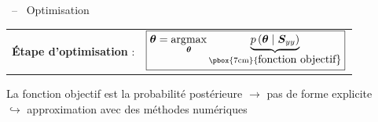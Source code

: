 \documentclass[10pt,xcolor=x11names,compress, show notes]{beamer}%
\newlength{\pas}	\setlength{\pas}{0.2cm}
\begin{document}
\begin{frame}{\insertsectionhead ~--~ Optimisation}
	\centering
	\vfill	
	\begin{tabular}{c c}
		\textbf{Étape d'optimisation }:&
		$\boxed{ \displaystyle  \bm{\theta} =\underset{\bm{\theta}}{\arg\!\max} \underbrace{p\left( \bm{\theta} \mid \bm{S}_{yy}\right)}_{ \text{\pbox{7cm}{\centering \normalsize fonction objectif}}}}$ %
	\end{tabular}
	\vfill
	La fonction objectif est la probabilité postérieure $\rightarrow$ pas de forme explicite\\
	$\hookrightarrow$ approximation avec des méthodes numériques
	


\end{frame}
\end{document}
